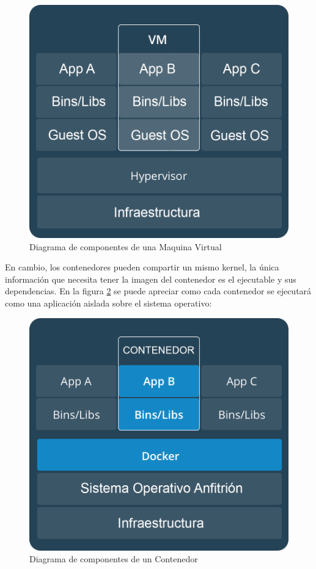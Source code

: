 \begin{figure}[H]
	\centering
		\includegraphics[width=.9\textwidth]{figures/docker_vm}
	\caption{Diagrama de componentes de una Maquina Virtual}
	\label{fig:docker_vm}
\end{figure}

En cambio, los contenedores pueden compartir un mismo kernel, la única información que necesita tener la imagen del contenedor es el ejecutable y sus dependencias.
En la figura \ref{fig:docker_container} se puede apreciar como cada contenedor se ejecutará como una aplicación aislada sobre el sistema operativo:

\begin{figure}[H]
	\centering
		\includegraphics[width=.8\textwidth]{figures/docker_container}
	\caption{Diagrama de componentes de un Contenedor}
	\label{fig:docker_container}
\end{figure}

